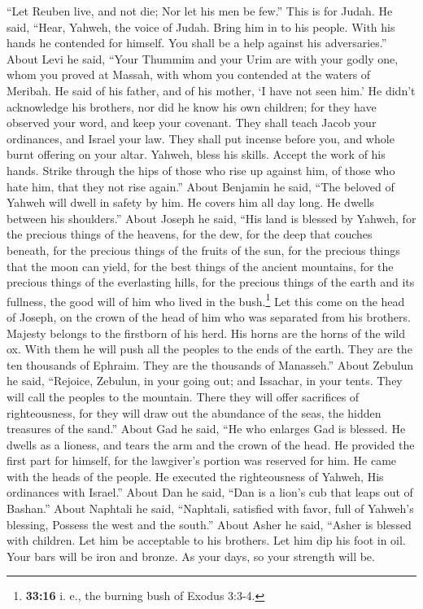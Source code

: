  ``Let Reuben live, and not die; Nor let his men be few.''
 This is for Judah. He said, ``Hear, Yahweh, the voice of
Judah. Bring him in to his people. With his hands he contended for
himself. You shall be a help against his adversaries.'' 
About Levi he said, ``Your Thummim and your Urim are with your godly
one, whom you proved at Massah, with whom you contended at the waters of
Meribah.  He said of his father, and of his mother, `I
have not seen him.' He didn't acknowledge his brothers, nor did he know
his own children; for they have observed your word, and keep your
covenant.  They shall teach Jacob your ordinances, and
Israel your law. They shall put incense before you, and whole burnt
offering on your altar.  Yahweh, bless his skills. Accept
the work of his hands. Strike through the hips of those who rise up
against him, of those who hate him, that they not rise again.''
 About Benjamin he said, ``The beloved of Yahweh will
dwell in safety by him. He covers him all day long. He dwells between
his shoulders.''  About Joseph he said, ``His land is
blessed by Yahweh, for the precious things of the heavens, for the dew,
for the deep that couches beneath,  for the precious
things of the fruits of the sun, for the precious things that the moon
can yield,  for the best things of the ancient mountains,
for the precious things of the everlasting hills,  for
the precious things of the earth and its fullness, the good will of him
who lived in the bush.\footnote{\textbf{33:16} i. e., the burning bush
  of Exodus 3:3-4.} Let this come on the head of Joseph, on the crown of
the head of him who was separated from his brothers. 
Majesty belongs to the firstborn of his herd. His horns are the horns of
the wild ox. With them he will push all the peoples to the ends of the
earth. They are the ten thousands of Ephraim. They are the thousands of
Manasseh.''  About Zebulun he said, ``Rejoice, Zebulun,
in your going out; and Issachar, in your tents.  They
will call the peoples to the mountain. There they will offer sacrifices
of righteousness, for they will draw out the abundance of the seas, the
hidden treasures of the sand.''  About Gad he said, ``He
who enlarges Gad is blessed. He dwells as a lioness, and tears the arm
and the crown of the head.  He provided the first part
for himself, for the lawgiver's portion was reserved for him. He came
with the heads of the people. He executed the righteousness of Yahweh,
His ordinances with Israel.''  About Dan he said, ``Dan
is a lion's cub that leaps out of Bashan.''  About
Naphtali he said, ``Naphtali, satisfied with favor, full of Yahweh's
blessing, Possess the west and the south.''  About Asher
he said, ``Asher is blessed with children. Let him be acceptable to his
brothers. Let him dip his foot in oil.  Your bars will be
iron and bronze. As your days, so your strength will be.

